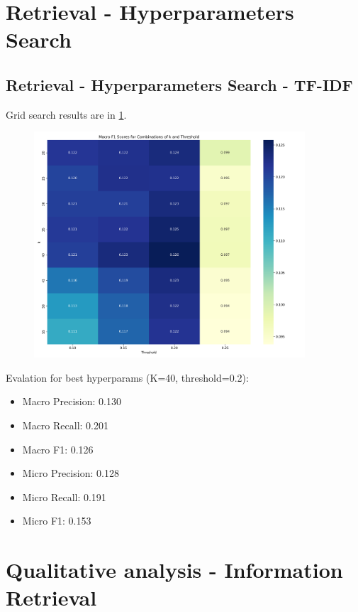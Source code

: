 \documentclass[a4paper,11pt]{article}
\begin{document}
\section{Retrieval - Hyperparameters Search}

\subsection{Retrieval - Hyperparameters Search - TF-IDF}
Grid search results are in \ref{fig:parameter_heatmap_tfidf}.
\begin{figure}
    \centering
    \includegraphics[width=0.9\textwidth]{ir_parameter_heatmap1747239585.png}
    \label{fig:parameter_heatmap_tfidf}
\end{figure}

Evalation for best hyperparams (K=40, threshold=0.2):
\begin{itemize}
    \item Macro Precision: 0.130
    \item Macro Recall: 0.201
    \item Macro F1: 0.126
    \item Micro Precision: 0.128
    \item Micro Recall: 0.191
    \item Micro F1: 0.153
\end{itemize}


\section{Qualitative analysis - Information Retrieval}
\end{document}
